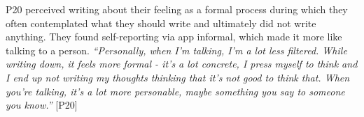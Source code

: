         P20 perceived writing about their feeling as a formal process during which they often contemplated what they should write and ultimately did not write anything. They found self-reporting via \acl{app} informal, which made it more like talking to a person.
                \textit{``Personally, when I’m talking, I’m a lot less filtered. While writing down, it feels more formal - it’s a lot concrete, I press myself to think and I end up not writing my thoughts thinking that it’s not good to think that. When you’re talking, it's a lot more personable, maybe something you say to someone you know.''}
                [P20]
            
            

